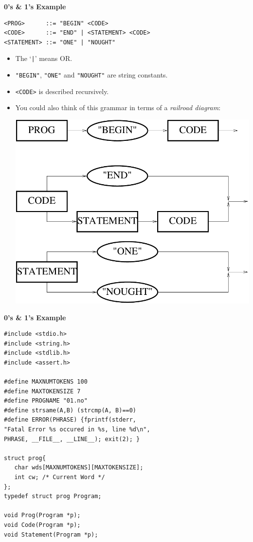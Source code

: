 \newpage
{\samepage
\begin{center}
{\Large{\bf 0's \& 1's Example}}
\end{center}
{\small
\begin{verbatim}
<PROG>      ::= "BEGIN" <CODE>
<CODE>      ::= "END" | <STATEMENT> <CODE>
<STATEMENT> ::= "ONE" | "NOUGHT"
\end{verbatim}
\begin{itemize}
\item The `\verb^|^' means OR.
\item \verb^"BEGIN"^, \verb^"ONE"^ and \verb^"NOUGHT"^ are string constants.
\item \verb^<CODE>^ is described recursively.
\item You could also think of this grammar in terms of a {\it railroad diagram}:
\begin{center}
\includegraphics{../Images/railroad.pdf}
\end{center}
\end{itemize}
}}

\newpage
{\samepage
\begin{center}
{\Large{\bf 0's \& 1's Example}}
\end{center}
\begin{verbatim}
#include <stdio.h>
#include <string.h>
#include <stdlib.h>
#include <assert.h>

#define MAXNUMTOKENS 100
#define MAXTOKENSIZE 7
#define PROGNAME "01.no"
#define strsame(A,B) (strcmp(A, B)==0)
#define ERROR(PHRASE) {fprintf(stderr,
"Fatal Error %s occured in %s, line %d\n",
PHRASE, __FILE__, __LINE__); exit(2); }

struct prog{
   char wds[MAXNUMTOKENS][MAXTOKENSIZE];
   int cw; /* Current Word */
};
typedef struct prog Program;

void Prog(Program *p);
void Code(Program *p);
void Statement(Program *p);

\end{verbatim}
}

